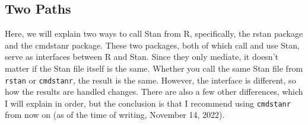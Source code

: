 \documentclass{ltjsbook}
\begin{document}
\subsection{Two Paths}
Here, we will explain two ways to call Stan from R, specifically, the rstan package and the cmdstanr package.
These two packages, both of which call and use Stan, serve as interfaces between R and Stan. Since they only mediate, it doesn't matter if the Stan file itself is the same. Whether you call the same Stan file from \verb|rstan| or \verb|cmdstanr|, the result is the same. However, the interface is different, so how the results are handled changes. There are also a few other differences, which I will explain in order, but the conclusion is that I recommend using \verb|cmdstanr| from now on (as of the time of writing, November 14, 2022).
\end{document}
